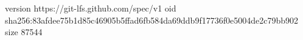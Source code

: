 version https://git-lfs.github.com/spec/v1
oid sha256:83afdee75b1d85c46905b5ffad6fb584da69ddb9f17736f0e5004de2c79bb902
size 87544
